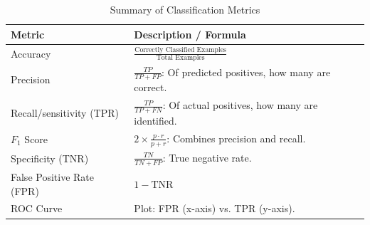 \documentclass[10pt,oneside,a4paper]{article}
\begin{document}
\begin{table}[H]
    \centering
    \begin{tabular}{|l|l|}
        \hline
        \textbf{Metric}           & \textbf{Description / Formula}                                       \\ \hline
        Accuracy                  & $\frac{\text{Correctly Classified Examples}}{\text{Total Examples}}$ \\ \hline
        Precision                 & $\frac{TP}{TP + FP}$: Of predicted positives, how many are correct.  \\ \hline
        Recall/sensitivity (TPR)  & $\frac{TP}{TP + FN}$: Of actual positives, how many are identified.  \\ \hline
        $F_1$ Score               & $2 \times \frac{p \cdot r}{p + r}$: Combines precision and recall.   \\ \hline
        Specificity (TNR)         & $\frac{TN}{TN + FP}$: True negative rate.                            \\ \hline
        False Positive Rate (FPR) & $1 - \text{TNR}$                                                     \\ \hline
        ROC Curve                 & Plot: FPR (x-axis) vs. TPR (y-axis).                                 \\ \hline
    \end{tabular}
    \caption{Summary of Classification Metrics}
\end{table}
\end{document}
